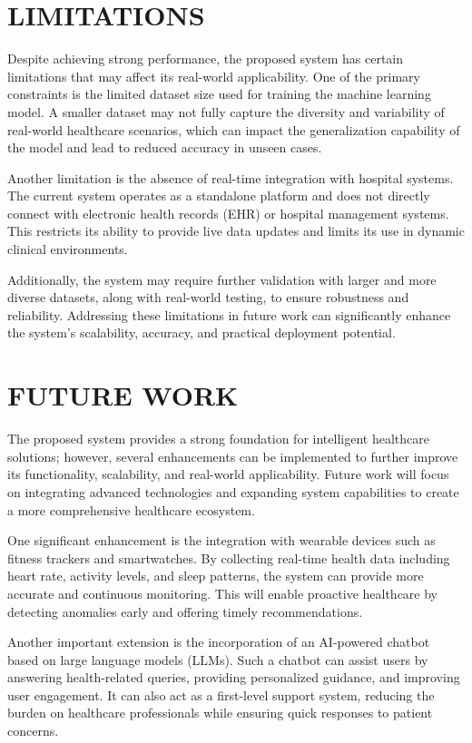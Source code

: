 \documentclass[conference]{IEEEtran}
\begin{document}
\section{LIMITATIONS}

Despite achieving strong performance, the proposed system has certain limitations that may affect its real-world applicability. One of the primary constraints is the limited dataset size used for training the machine learning model. A smaller dataset may not fully capture the diversity and variability of real-world healthcare scenarios, which can impact the generalization capability of the model and lead to reduced accuracy in unseen cases.

Another limitation is the absence of real-time integration with hospital systems. The current system operates as a standalone platform and does not directly connect with electronic health records (EHR) or hospital management systems. This restricts its ability to provide live data updates and limits its use in dynamic clinical environments.

Additionally, the system may require further validation with larger and more diverse datasets, along with real-world testing, to ensure robustness and reliability. Addressing these limitations in future work can significantly enhance the system’s scalability, accuracy, and practical deployment potential.
 
\section{FUTURE WORK}

The proposed system provides a strong foundation for intelligent healthcare solutions; however, several enhancements can be implemented to further improve its functionality, scalability, and real-world applicability. Future work will focus on integrating advanced technologies and expanding system capabilities to create a more comprehensive healthcare ecosystem.

One significant enhancement is the integration with wearable devices such as fitness trackers and smartwatches. By collecting real-time health data including heart rate, activity levels, and sleep patterns, the system can provide more accurate and continuous monitoring. This will enable proactive healthcare by detecting anomalies early and offering timely recommendations.

Another important extension is the incorporation of an AI-powered chatbot based on large language models (LLMs). Such a chatbot can assist users by answering health-related queries, providing personalized guidance, and improving user engagement. It can also act as a first-level support system, reducing the burden on healthcare professionals while ensuring quick responses to patient concerns.
\end{document}
